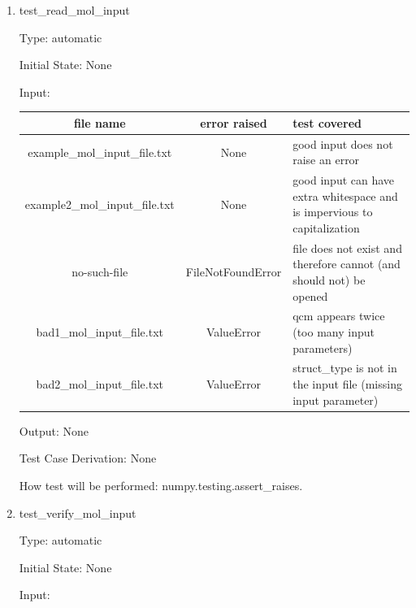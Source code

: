 \documentclass[12pt, titlepage]{article}
\begin{document}
\begin{enumerate}
	
\item{test\_read\_mol\_input\\}

Type: automatic

Initial State: None

Input: 
	
\begin{table}[H]
	\begin{tabular}{ccp{4cm}}
		\toprule
		file name & error raised & test covered \\
		\midrule
		example\_mol\_input\_file.txt & None & good input does not raise an 
		error \\
		example2\_mol\_input\_file.txt & None & good input can have extra 
		whitespace and is impervious to capitalization \\
		no-such-file & FileNotFoundError & file does not exist and therefore 
		cannot (and should not) be opened \\
		bad1\_mol\_input\_file.txt & ValueError & qcm appears twice (too 
		many input parameters) \\
		bad2\_mol\_input\_file.txt & ValueError & struct\_type is not in the 
		input file (missing input parameter) \\
	\end{tabular}
\end{table}
	
Output: None

Test Case Derivation: None

How test will be performed: numpy.testing.assert\_raises.

\item{test\_verify\_mol\_input\\}

Type: automatic

Initial State: None

Input:


\end{enumerate}
\end{document}
